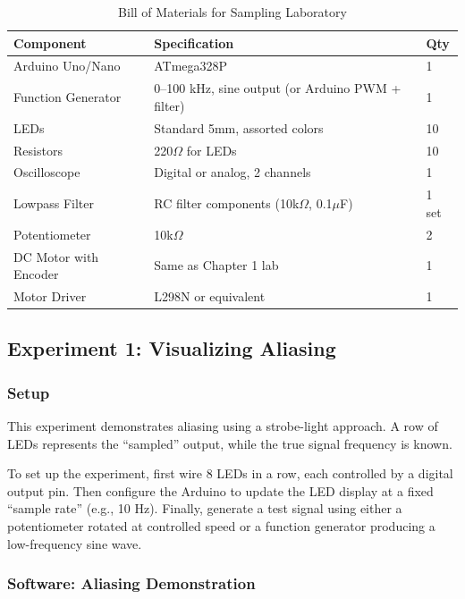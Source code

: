 \begin{table}[htbp]
\centering
\caption{Bill of Materials for Sampling Laboratory}
\label{tab:sampling_bom}
\begin{tabular}{lll}
\toprule
\textbf{Component} & \textbf{Specification} & \textbf{Qty} \\
\midrule
Arduino Uno/Nano & ATmega328P & 1 \\
Function Generator & 0--100 kHz, sine output (or Arduino PWM + filter) & 1 \\
LEDs & Standard 5mm, assorted colors & 10 \\
Resistors & 220$\Omega$ for LEDs & 10 \\
Oscilloscope & Digital or analog, 2 channels & 1 \\
Lowpass Filter & RC filter components (10k$\Omega$, 0.1$\mu$F) & 1 set \\
Potentiometer & 10k$\Omega$ & 2 \\
DC Motor with Encoder & Same as Chapter 1 lab & 1 \\
Motor Driver & L298N or equivalent & 1 \\
\bottomrule
\end{tabular}
\end{table}

\subsection{Experiment 1: Visualizing Aliasing}

\subsubsection{Setup}

This experiment demonstrates aliasing using a strobe-light approach. A row of LEDs represents the ``sampled'' output, while the true signal frequency is known.

To set up the experiment, first wire 8 LEDs in a row, each controlled by a digital output pin. Then configure the Arduino to update the LED display at a fixed ``sample rate'' (e.g., 10 Hz). Finally, generate a test signal using either a potentiometer rotated at controlled speed or a function generator producing a low-frequency sine wave.

\subsubsection{Software: Aliasing Demonstration}

